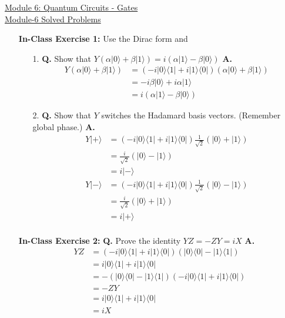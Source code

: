 \documentclass[main.tex]{subfiles}
\begin{document}
\href{https://www2.seas.gwu.edu/~simhaweb/quantum/modules/module6/module6.html}{Module 6: Quantum Circuits - Gates}\\
\href{https://www2.seas.gwu.edu/~simhaweb/quantum/modules/module6/problems6.html}{Module-6 Solved Problems}

\begin{enumerate}

\item[] \textbf{In-Class Exercise 1:} Use the Dirac form and
\begin{enumerate}
    \item [1.] \textbf{Q.} Show that $Y(\alpha|0\rangle+\beta|1\rangle)=i(\alpha|1\rangle-\beta|0\rangle)$ \textbf{A.}
    \begin{align*}
        Y(\alpha|0\rangle + \beta |1\rangle)    & = (-i|0\rangle\langle1| + i|1\rangle\langle0|)
                                                (\alpha|0\rangle + \beta |1\rangle)\\
                                                & = -i\beta|0\rangle + i\alpha|1\rangle\\
                                                & = i(\alpha|1\rangle-\beta|0\rangle)
    \end{align*}        
    \item [2.] \textbf{Q.} Show that $Y$ switches the Hadamard basis vectors. (Remember global phase.) \textbf{A.}
    \begin{align*}
        Y|+\rangle  & = (-i|0\rangle\langle 1|+i| 1\rangle\langle 0|)\frac{1}{\sqrt{2}}(|0\rangle + |1\rangle)\\
                    & = \frac{i}{\sqrt{2}}(|0\rangle - |1\rangle)\\
                    & = i|-\rangle\\
        Y|-\rangle  & = (-i|0\rangle\langle 1|+i| 1\rangle\langle 0|)\frac{1}{\sqrt{2}}(|0\rangle - |1\rangle)\\
                    & = \frac{i}{\sqrt{2}}(|0\rangle + |1\rangle)\\
                    & = i|+\rangle\\
    \end{align*}
\end{enumerate}

\item[] \textbf{In-Class Exercise 2:} \textbf{Q.} Prove the identity $YZ=-ZY=iX$ \textbf{A.}
    \begin{align*}
        YZ  & = (-i|0\rangle\langle1| + i|1\rangle\langle0|)(|0\rangle\langle0| - |1\rangle\langle1|)\\
            & = i|0\rangle\langle1| + i|1\rangle\langle 0|\\
            & = -(|0\rangle\langle0| - |1\rangle\langle1|)(-i|0\rangle\langle1| + i|1\rangle\langle0|)\\
            & = -ZY\\
            & = i|0\rangle\langle1| + i|1\rangle\langle 0|\\
            & = iX
    \end{align*}


\end{enumerate}
\end{document}
